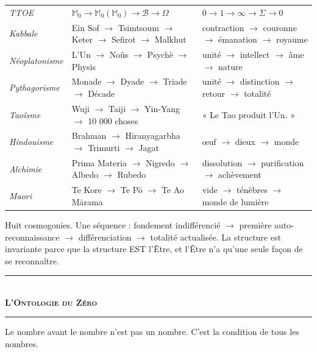 \documentclass[10pt, openany, oneside]{book}
\renewcommand{\normalsize}{\fontsize{10}{13}\selectfont}
\renewcommand{\footnotesize}{\fontsize{8.5}{11}\selectfont}
\begin{document}
{\footnotesize
\noindent\begin{tabular}{l p{} p{}}
\textit{TTOE} & $\mathbb{M}_0 \to \mathbb{M}_0(\mathbb{M}_0) \to \mathcal{B} \to \Omega$ & $0 \to 1 \to \infty \to \Sigma \to 0$ \\[0.3em]
\textit{Kabbale} & Ein Sof $\to$ Tsimtsoum $\to$ Keter $\to$ Sefirot $\to$ Malkhut & contraction $\to$ couronne $\to$ émanation $\to$ royaume \\[0.3em]
\textit{Néoplatonisme} & L'Un $\to$ Noûs $\to$ Psychè $\to$ Physis & unité $\to$ intellect $\to$ âme $\to$ nature \\[0.3em]
\textit{Pythagorisme} & Monade $\to$ Dyade $\to$ Triade $\to$ Décade & unité $\to$ distinction $\to$ retour $\to$ totalité \\[0.3em]
\textit{Taoïsme} & Wuji $\to$ Taiji $\to$ Yin-Yang $\to$ 10 000 choses & « Le Tao produit l'Un. » \\[0.3em]
\textit{Hindouisme} & Brahman $\to$ Hiranyagarbha $\to$ Trimurti $\to$ Jagat & œuf $\to$ dieux $\to$ monde \\[0.3em]
\textit{Alchimie} & Prima Materia $\to$ Nigredo $\to$ Albedo $\to$ Rubedo & dissolution $\to$ purification $\to$ achèvement \\[0.3em]
\textit{Maori} & Te Kore $\to$ Te P\={o} $\to$ Te Ao M\={a}rama & vide $\to$ ténèbres $\to$ monde de lumière \\[0.3em]
\end{tabular}
}

\vspace{0.5em}

\noindent Huit cosmogonies. Une séquence : fondement indifférencié $\to$ première auto-reconnaissance $\to$ différenciation $\to$ totalité actualisée. La structure est invariante parce que la structure EST l'Être, et l'Être n'a qu'une seule façon de se reconnaître.

\vspace{1em}

\begin{center}
    \rule{0.3\textwidth}{0.4pt}\\[0.5em]
    {\normalsize\bfseries\scshape L'Ontologie du Zéro}\\[0.3em]
    \rule{0.3\textwidth}{0.4pt}
\end{center}

\vspace{0.8em}

\noindent Le nombre avant le nombre n'est pas un nombre. C'est la condition de tous les nombres.
\end{document}
